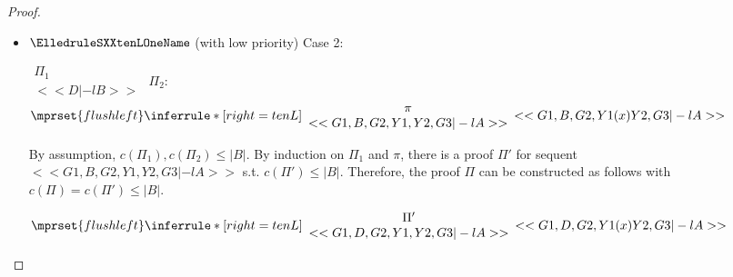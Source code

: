 \begin{proof}
\begin{enumerate}
\begin{itemize}
  \item $\ElledruleSXXtenLOneName$ (with low priority) Case 2:
      \begin{center}
        \scriptsize
        \begin{math}
          \begin{array}{c}
            \Pi_1 \\
            {<<D |-l B>>}
          \end{array}
        \end{math}
        \qquad\qquad
        $\Pi_2$:
        \begin{math}
          $$\mprset{flushleft}
          \inferrule* [right={\tiny tenL}] {
            {
              \begin{array}{c}
                \pi \\
                {<<G1, B, G2, Y1, Y2, G3 |-l A>>}
              \end{array}
            }
          }{<<G1, B, G2, Y1 (x) Y2, G3 |-l A>>}
        \end{math}
      \end{center}
      By assumption, $c(\Pi_1),c(\Pi_2)\leq |B|$. By induction on $\Pi_1$ and $\pi$, there is
      a proof $\Pi'$ for sequent $<<G1, B, G2, Y1, Y2, G3 |-l A>>$ s.t. $c(\Pi') \leq |B|$.
      Therefore, the proof $\Pi$ can be constructed as follows with
      $c(\Pi) = c(\Pi') \leq |B|$.
      \begin{center}
        \scriptsize
        \begin{math}
          $$\mprset{flushleft}
          \inferrule* [right={\tiny tenL}] {
            {
              \begin{array}{c}
                \Pi' \\
                {<<G1, D, G2, Y1, Y2, G3 |-l A>>}
              \end{array}
            }
          }{<<G1, D, G2, Y1 (x) Y2, G3 |-l A>>}
        \end{math}
      \end{center}


\end{itemize}
\end{enumerate}
\end{proof}
